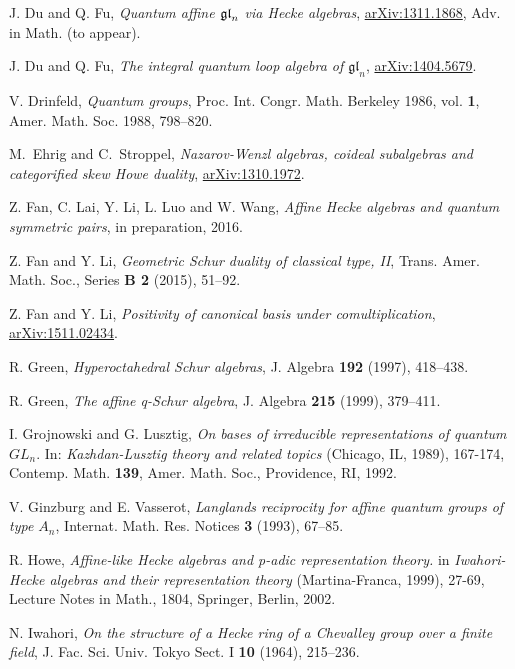 \documentclass[12pt,reqno]{amsart}
\numberwithin{equation}{section}
\theoremstyle{definition}
\theoremstyle{plain}
\begin{document}
\begin{thebibliography}{DDPW08}
J. Du and Q. Fu,
{\em  Quantum affine $\frak{gl}_n$ via Hecke algebras},
\href{http://arxiv.org/abs/1311.1868}{arXiv:1311.1868}, 
Adv. in Math. (to appear).

J. Du and Q. Fu,
{\em The integral quantum loop algebra of $\mathfrak{gl}_n$}, 
\href{http://arxiv.org/abs/1404.5679}{arXiv:1404.5679}.   

 V. Drinfeld,
{\em Quantum groups}, Proc. Int. Congr. Math. Berkeley 1986, vol. {\bf 1}, Amer. Math. Soc. 1988, 798--820. 
 
M.~Ehrig and C.~Stroppel,
{\em Nazarov-Wenzl algebras, coideal subalgebras and categorified skew Howe duality}, 
\href{http://arxiv.org/abs/1310.1972}{arXiv:1310.1972}.

Z. Fan, C. Lai,  Y. Li, L. Luo and W. Wang,
{\em Affine Hecke algebras and quantum symmetric pairs}, in preparation, 2016. 

Z. Fan and Y. Li,
{\em Geometric Schur duality of classical type, II},
Trans. Amer. Math. Soc.,
Series {\bf B 2} (2015), 51--92.  

Z. Fan and Y. Li,
{\em Positivity of canonical basis under comultiplication},  
\href{http://arxiv.org/abs/1511.02434}{arXiv:1511.02434}.

R. Green, 
{\em Hyperoctahedral Schur algebras}, 
J. Algebra  {\bf 192} (1997), 418--438.

R. Green,
{\em The affine q-Schur algebra},
J. Algebra {\bf 215} (1999), 379--411.

I. Grojnowski and G. Lusztig, 
{\em  On bases of irreducible representations of quantum $GL_n$}. 
In:  {\em Kazhdan-Lusztig theory and related topics}  
(Chicago, IL, 1989), 167-174, Contemp. Math. {\bf 139}, Amer. Math. Soc., Providence, RI, 1992.

V. Ginzburg and E. Vasserot,  
{\em Langlands reciprocity for affine quantum groups of type $A_n$},
Internat. Math. Res. Notices {\bf 3} (1993), 67--85. 

R. Howe, 
{\em Affine-like Hecke algebras and p-adic representation theory.} in
{\em  Iwahori-Hecke algebras and their representation theory} 
(Martina-Franca, 1999), 27-69, Lecture Notes in Math., 1804, Springer, Berlin, 2002.

 N. Iwahori,
{\em On the structure of a Hecke ring of a Chevalley group over a finite field}, 
J. Fac. Sci. Univ. Tokyo Sect. I {\bf 10} (1964), 215--236.


\end{thebibliography}
\end{document}
